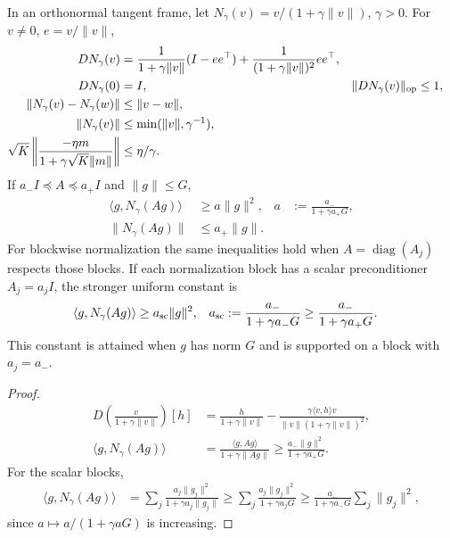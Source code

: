 \begin{proposition}
\label{prop:normalization-rigid}
In an orthonormal tangent frame, let $N_\gamma(v)=v/(1+\gamma\|v\|)$, $\gamma>0$. For $v\ne0$, $e=v/\|v\|$,
\begin{align}
 DN_\gamma(v)
 &=\frac1{1+\gamma\|v\|}(I-ee^\top)
   +\frac1{(1+\gamma\|v\|)^2}ee^\top,\\
 DN_\gamma(0)&=I,&\|DN_\gamma(v)\|_{\rm op}&\le1,\\
 \|N_\gamma(v)-N_\gamma(w)\|&\le\|v-w\|,\\
 \|N_\gamma(v)\|&\le\min(\|v\|,\gamma^{-1}),\\
 \sqrt K\left\|\frac{-\eta m}{1+\gamma\sqrt K\|m\|}\right\|
 &\le\eta/\gamma.\label{eq:step-cap}
\end{align}
If $a_-I\preceq A\preceq a_+I$ and $\|g\|\le G$,
\begin{align}\label{eq:rigid-alignment}
 \langle g,N_\gamma(Ag)\rangle
 &\ge a\|g\|^2,&a&:=\frac{a_-}{1+\gamma a_+G},\\
 \|N_\gamma(Ag)\|&\le a_+\|g\|.
\end{align}
For blockwise normalization the same inequalities hold when $A=\operatorname{diag}(A_j)$ respects those blocks.
If each normalization block has a scalar preconditioner $A_j=a_jI$, the stronger uniform constant is
\begin{align}\label{eq:sharp-scalar-alignment}
 \langle g,N_\gamma(Ag)\rangle
 &\ge a_{\rm sc}\|g\|^2,&
 a_{\rm sc}&:=\frac{a_-}{1+\gamma a_-G}
 \ge\frac{a_-}{1+\gamma a_+G}.
\end{align}
This constant is attained when $g$ has norm $G$ and is supported on a block with $a_j=a_-$.
\end{proposition}
\begin{proof}
\begin{align}
 D\left(\frac v{1+\gamma\|v\|}\right)[h]
 &=\frac h{1+\gamma\|v\|}
 -\frac{\gamma\langle v,h\rangle v}{\|v\|(1+\gamma\|v\|)^2},\\
 \langle g,N_\gamma(Ag)\rangle
 &=\frac{\langle g,Ag\rangle}{1+\gamma\|Ag\|}
 \ge\frac{a_-\|g\|^2}{1+\gamma a_+G}.
\end{align}
For the scalar blocks,
\begin{align}
 \langle g,N_\gamma(Ag)\rangle
 &=\sum_j\frac{a_j\|g_j\|^2}{1+\gamma a_j\|g_j\|}
 \ge\sum_j\frac{a_j\|g_j\|^2}{1+\gamma a_jG}
 \ge\frac{a_-}{1+\gamma a_-G}\sum_j\|g_j\|^2,
\end{align}
since $a\mapsto a/(1+\gamma aG)$ is increasing.
\end{proof}

